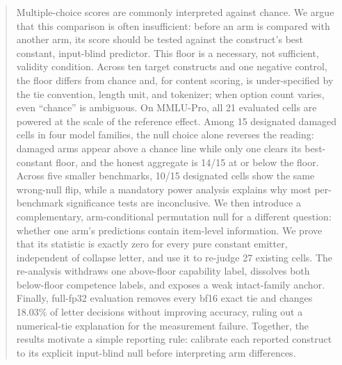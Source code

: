 \begin{abstract}
Multiple-choice scores are commonly interpreted against chance. We argue that this comparison is often insufficient: before an arm is compared with another arm, its score should be tested against the construct's best constant, input-blind predictor. This floor is a necessary, not sufficient, validity condition. Across ten target constructs and one negative control, the floor differs from chance and, for content scoring, is under-specified by the tie convention, length unit, and tokenizer; when option count varies, even ``chance'' is ambiguous. On MMLU-Pro, all 21 evaluated cells are powered at the scale of the reference effect. Among 15 designated damaged cells in four model families, the null choice alone reverses the reading: damaged arms appear above a chance line while only one clears its best-constant floor, and the honest aggregate is 14/15 at or below the floor. Across five smaller benchmarks, 10/15 designated cells show the same wrong-null flip, while a mandatory power analysis explains why most per-benchmark significance tests are inconclusive. We then introduce a complementary, arm-conditional permutation null for a different question: whether one arm's predictions contain item-level information. We prove that its statistic is exactly zero for every pure constant emitter, independent of collapse letter, and use it to re-judge 27 existing cells. The re-analysis withdraws one above-floor capability label, dissolves both below-floor competence labels, and exposes a weak intact-family anchor. Finally, full-fp32 evaluation removes every bf16 exact tie and changes 18.03\% of letter decisions without improving accuracy, ruling out a numerical-tie explanation for the measurement failure. Together, the results motivate a simple reporting rule: calibrate each reported construct to its explicit input-blind null before interpreting arm differences.
\end{abstract}
